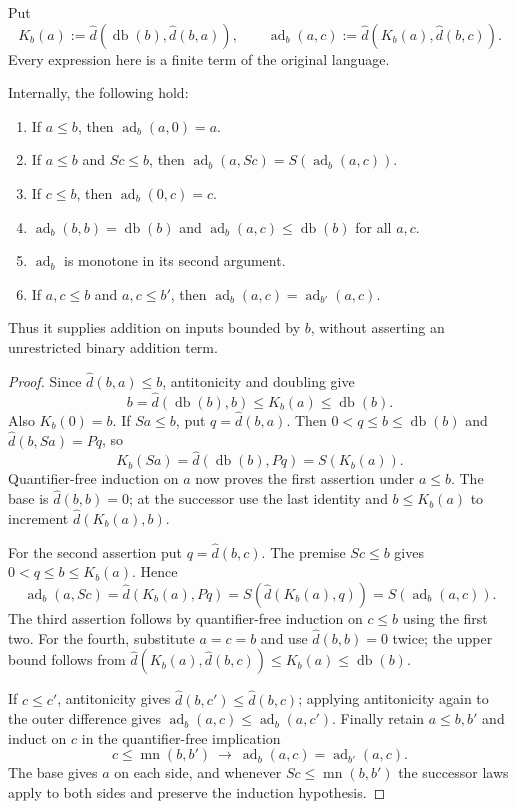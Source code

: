 Put
\[
 K_b(a):=\widehat d(\operatorname{db}(b),\widehat d(b,a)),\qquad
 \operatorname{ad}_b(a,c):=\widehat d(K_b(a),\widehat d(b,c)).
 \tag{Bounded addition}\label{eq:internal-bounded-addition}
\]
Every expression here is a finite term of the original language.

\begin{lemma}
\label{lem:internal-bounded-addition}
Internally, the following hold:
\begin{enumerate}
\item If $a\le b$, then $\operatorname{ad}_b(a,0)=a$.
\item If $a\le b$ and $Sc\le b$, then
      $\operatorname{ad}_b(a,Sc)=S(\operatorname{ad}_b(a,c))$.
\item If $c\le b$, then $\operatorname{ad}_b(0,c)=c$.
\item $\operatorname{ad}_b(b,b)=\operatorname{db}(b)$ and $\operatorname{ad}_b(a,c)\le \operatorname{db}(b)$ for all $a,c$.
\item $\operatorname{ad}_b$ is monotone in its second argument.
\item If $a,c\le b$ and $a,c\le b'$, then
      $\operatorname{ad}_b(a,c)=\operatorname{ad}_{b'}(a,c)$.
\end{enumerate}
Thus it supplies addition on inputs bounded by $b$, without asserting an
unrestricted binary addition term.
\end{lemma}
\begin{proof}
Since $\widehat d(b,a)\le b$, antitonicity and doubling give
\[
            b=\widehat d(\operatorname{db}(b),b)\le K_b(a)\le \operatorname{db}(b).
 \tag{K bounds}\label{eq:internal-K-bounds}
\]
Also $K_b(0)=b$.  If $Sa\le b$, put $q=\widehat d(b,a)$.
Then $0<q\le b\le \operatorname{db}(b)$ and $\widehat d(b,Sa)=Pq$, so
\[
                  K_b(Sa)=\widehat d(\operatorname{db}(b),Pq)=S(K_b(a)).
\]
Quantifier-free induction on $a$ now proves the first assertion under
$a\le b$.  The base is $\widehat d(b,b)=0$; at the successor use the last
identity and $b\le K_b(a)$ to increment $\widehat d(K_b(a),b)$.

For the second assertion put $q=\widehat d(b,c)$.  The premise $Sc\le b$ gives
$0<q\le b\le K_b(a)$.  Hence
\[
 \operatorname{ad}_b(a,Sc)
   =\widehat d(K_b(a),Pq)=S(\widehat d(K_b(a),q))=S(\operatorname{ad}_b(a,c)).
\]
The third assertion follows by quantifier-free induction on $c\le b$
using the first two.  For the fourth, substitute $a=c=b$ and use
$\widehat d(b,b)=0$ twice; the upper bound follows from
$\widehat d(K_b(a),\widehat d(b,c))\le K_b(a)\le \operatorname{db}(b)$.

If $c\le c'$, antitonicity gives $\widehat d(b,c')\le \widehat d(b,c)$; applying
antitonicity again to the outer difference gives
$\operatorname{ad}_b(a,c)\le \operatorname{ad}_b(a,c')$.  Finally retain $a\le b,b'$ and induct on $c$
in the quantifier-free implication
\[
 c\le \operatorname{mn}(b,b')\ \longrightarrow\ \operatorname{ad}_b(a,c)=\operatorname{ad}_{b'}(a,c).
\]
The base gives $a$ on each side, and whenever $Sc\le \operatorname{mn}(b,b')$ the
successor laws apply to both sides and preserve the induction hypothesis.
\end{proof}

